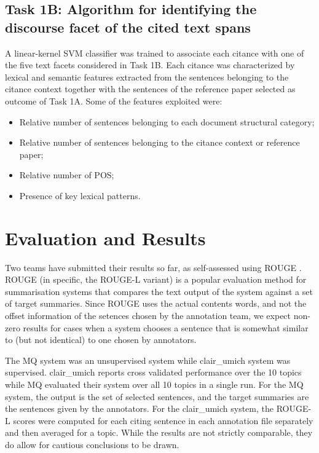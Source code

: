 \documentclass[11pt]{article}
\begin{document}
\subsection{Task 1B: Algorithm for identifying the discourse facet of the 
											cited text spans}
A linear-kernel SVM classifier was trained to associate each citance with one
 of the five text facets considered in Task 1B. Each citance was characterized 
 by lexical and semantic features extracted from the sentences belonging to 
 the citance context together with the sentences of the reference paper 
 selected as outcome of Task 1A.   Some of the features exploited were:
\begin{itemize}
\item{Relative number of sentences belonging to each document
  structural category;}
\vspace{-.3cm}
\item{Relative number of sentences belonging to the citance context or
  reference paper;}
\vspace{-.3cm}
\item{Relative number of POS;}
\vspace{-.3cm}
\item{Presence of key lexical patterns.}
\end{itemize}

\section{Evaluation and Results}
Two teams have submitted their results so far, as self-assessed using
ROUGE \cite{Lin:2004}. ROUGE (in specific, the ROUGE-L variant) is a
popular evaluation method for summarisation systems that compares the
text output of the system against a set of target summaries. Since
ROUGE uses the actual contents words, and not the offset information
of the setences chosen by the annotation team, we expect non-zero
results for cases when a system chooses a sentence that is somewhat
similar to (but not identical) to one chosen by annotators.

The MQ system was an unsupervised system while clair\_umich system was
supervised. clair\_umich reports cross validated performance over the
10 topics while MQ evaluated their system over all 10 topics in a
single run.  For the MQ system, the output is the set of selected
sentences, and the target summaries are the sentences given by the
annotators.  For the clair\_umich system, the ROUGE-L scores were
computed for each citing sentence in each annotation file separately
and then averaged for a topic.  While the results are not strictly
comparable, they do allow for cautious conclusions to be drawn.
\end{document}

